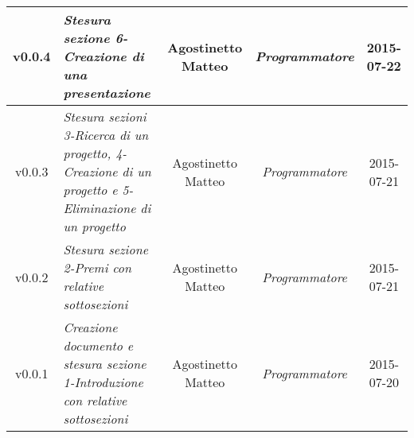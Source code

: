 	
\begin{table}[h]
	\centering
	\begin{tabular}{|c|p{}|c|c|c|}
	\toprule
		v0.0.4 & \textit{Stesura sezione 6-Creazione di una presentazione} & Agostinetto Matteo & \textit{Programmatore} & 2015-07-22\\
	\midrule
		v0.0.3 & \textit{Stesura sezioni 3-Ricerca di un progetto, 4-Creazione di un progetto e 5-Eliminazione di un progetto} & Agostinetto Matteo & \textit{Programmatore} & 2015-07-21\\
	\midrule
		v0.0.2 & \textit{Stesura sezione 2-Premi con relative sottosezioni} & Agostinetto Matteo & \textit{Programmatore} & 2015-07-21\\
	\midrule
		v0.0.1 & \textit{Creazione documento e stesura sezione 1-Introduzione con relative sottosezioni} & Agostinetto Matteo & \textit{Programmatore} & 2015-07-20\\	
	\bottomrule	
\end{tabular}
\end{table}
\newpage